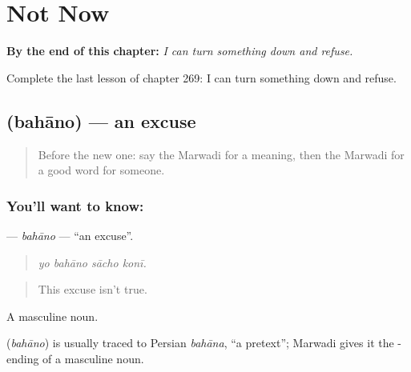 
\chapter{Not Now}
\label{ch:mw-not-now}

\begin{chapteropening}
\textbf{By the end of this chapter:} \emph{I can turn something down and refuse.}

Complete the last lesson of chapter 269: I can turn something down and refuse.
\end{chapteropening}

\section[\texorpdfstring{\mw{बहानो} (bahāno)}{बहानो (bahāno)}]{ (bahāno) — an excuse}

\label{lesson:MW-C269-bahano}



\begin{quote}
Before the new one: say the Marwadi for a meaning, then the Marwadi for a good word for someone.
\end{quote}

\subsection*{You'll want to know: }
\textbf{} — \emph{bahāno} — \textquotedblleft{}an excuse\textquotedblright{}.

\begin{quote}
   
\end{quote}

\begin{quote}
\emph{yo bahāno sācho konī.}
\end{quote}

\begin{quote}
This excuse isn't true.
\end{quote}

A masculine noun.

\begin{cousinweb}
\textbf{} (\emph{bahāno}) is usually traced to Persian \emph{bahāna}, \textquotedblleft{}a pretext\textquotedblright{}; Marwadi gives it the - ending of a masculine noun.
\end{cousinweb}


